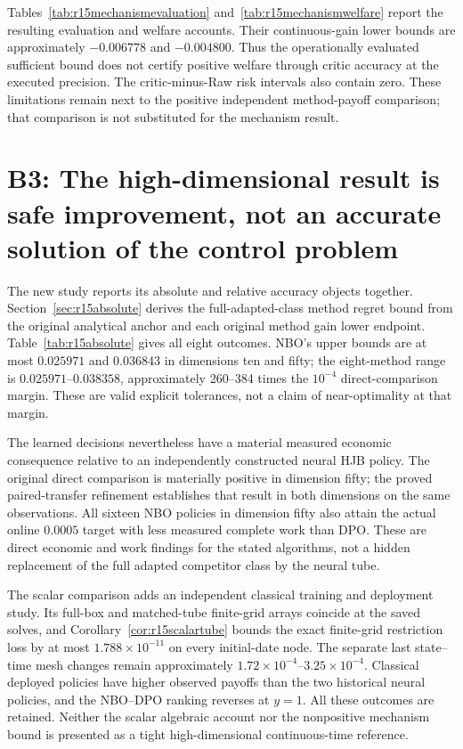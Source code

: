 Tables~\ref{tab:r15mechanismevaluation} and~\ref{tab:r15mechanismwelfare} report the resulting evaluation and welfare accounts. Their continuous-gain lower bounds are approximately $-0.006778$ and $-0.004800$. Thus the operationally evaluated sufficient bound does not certify positive welfare through critic accuracy at the executed precision. The critic-minus-Raw risk intervals also contain zero. These limitations remain next to the positive independent method-payoff comparison; that comparison is not substituted for the mechanism result.

\section*{B3: The high-dimensional result is safe improvement, not an accurate solution of the control problem}
The new study reports its absolute and relative accuracy objects together. Section~\ref{sec:r15absolute} derives the full-adapted-class method regret bound from the original analytical anchor and each original method gain lower endpoint. Table~\ref{tab:r15absolute} gives all eight outcomes. NBO's upper bounds are at most $0.025971$ and $0.036843$ in dimensions ten and fifty; the eight-method range is $0.025971$--$0.038358$, approximately 260--384 times the $10^{-4}$ direct-comparison margin. These are valid explicit tolerances, not a claim of near-optimality at that margin.

The learned decisions nevertheless have a material measured economic consequence relative to an independently constructed neural HJB policy. The original direct comparison is materially positive in dimension fifty; the proved paired-transfer refinement establishes that result in both dimensions on the same observations. All sixteen NBO policies in dimension fifty also attain the actual online $0.0005$ target with less measured complete work than DPO. These are direct economic and work findings for the stated algorithms, not a hidden replacement of the full adapted competitor class by the neural tube.

The scalar comparison adds an independent classical training and deployment study. Its full-box and matched-tube finite-grid arrays coincide at the saved solves, and Corollary~\ref{cor:r15scalartube} bounds the exact finite-grid restriction loss by at most $1.788\times10^{-11}$ on every initial-date node. The separate last state--time mesh changes remain approximately $1.72\times10^{-4}$--$3.25\times10^{-4}$. Classical deployed policies have higher observed payoffs than the two historical neural policies, and the NBO--DPO ranking reverses at $y=1$. All these outcomes are retained. Neither the scalar algebraic account nor the nonpositive mechanism bound is presented as a tight high-dimensional continuous-time reference.

